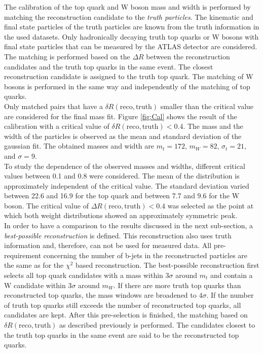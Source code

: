 The calibration of the top quark and W boson mass and width is performed by matching the reconstruction candidate to the \textit{truth particles}. The kinematic and final state particles of the truth particles are known from the truth information in the used datasets. Only hadronically decaying truth top quarks or W bosons with final state particles that can be measured by the ATLAS detector are considered. The matching is performed based on the $\Delta R$ between the reconstruction candidates and the truth top quarks in the same event. The closest reconstruction candidate is assigned to the truth top quark. The matching of W bosons is performed in the same way and independently of the matching of top quarks. \\
Only matched pairs that have a $\delta R(\text{reco},\text{truth})$ smaller than the critical value are considered for the final mass fit. Figure \ref{fig:Cal} shows the result of the calibration with a critical value of $\delta R(\text{reco},\text{truth}) < 0.4$. The mass and the width of the particles is observed as the mean and standard deviation of the gaussian fit.  The obtained masses and width are $m_t = 172$, $m_W = 82$, $\sigma_t = 21$, and $\sigma = 9$. \\
To study the dependence of the observed masses and widths, different critical values between 0.1 and 0.8 were considered. The mean of the distribution is approximately independent of the critical value. The standard deviation varied between 22.6 and 16.9 for the top quark and between 7.7 and 9.6 for the W boson. The critical value of $\Delta R(\text{reco},\text{truth}) < 0.4$ was selected as the point at which both weight distributions showed an approximately symmetric peak. \\
In order to have a comparison to the results discussed in the next sub-section, a \textit{best-possible reconstruction} is defined. This reconstruction also uses truth information and, therefore, can not be used for measured data. All pre-requirement concerning the number of b-jets in the reconstructed particles are the same as for the $\chi^2$ based reconstruction. The best-possible reconstruction first selects all top quark candidates with a mass within $3\sigma$ around $m_t$ and contain a W candidate within $3\sigma$ around $m_W$. If there are more truth top quarks than reconstructed top quarks, the mass windows are broadened to $4\sigma$. If the number of truth top quarks still exceeds the number of reconstructed top quarks, all candidates are kept. After this pre-selection is finished, the matching based on $\delta R(\text{reco},\text{truth})$ as described previously is performed. The candidates closest to the truth top quarks in the same event are said to be the reconstructed top quarks.

